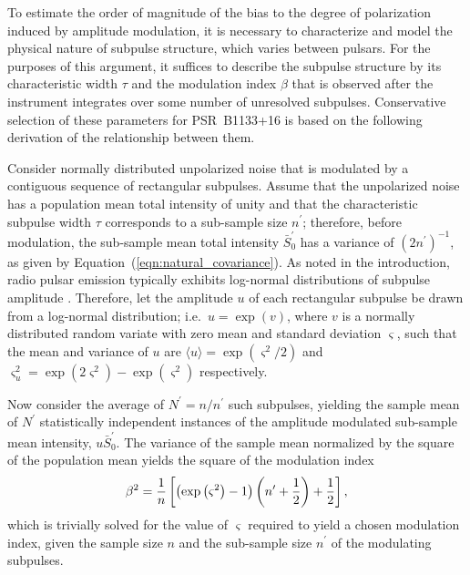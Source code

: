 \documentclass[twocolumn]{aastex6}
\newcommand{\Eqn}[1]{Equation~(\ref{eqn:#1})}
\begin{document}
{\begin{appendix}
To estimate the order of magnitude of the bias to the degree of
polarization induced by amplitude modulation, it is necessary to
characterize and model the physical nature of subpulse structure,
which varies between pulsars.
%
For the purposes of this argument, it suffices to describe the
subpulse structure by its characteristic width $\tau$ and the
modulation index $\beta$ that is observed after the instrument
integrates over some number of unresolved subpulses.
%
Conservative selection of these parameters for PSR~B1133+16 is based
on the following derivation of the relationship between them.

Consider normally distributed unpolarized noise that is modulated by a
contiguous sequence of rectangular subpulses.
%
Assume that the unpolarized noise has a population mean total
intensity of unity and that the characteristic subpulse width $\tau$
corresponds to a sub-sample size $n^\prime$; therefore, before modulation,
the sub-sample mean total intensity $\bar{S}^\prime_0$ has a variance of
$(2n^\prime)^{-1}$, as given by \Eqn{natural_covariance}.
%
As noted in the introduction, radio pulsar emission
typically exhibits log-normal distributions of subpulse amplitude
\citep[e.g.][]{cjd03a,ovb+14}.
%
Therefore, let the amplitude $u$ of each rectangular subpulse be
drawn from a log-normal distribution; i.e.\ $u=\exp(v)$, where $v$ is
a normally distributed random variate with zero mean and standard
deviation $\varsigma$, such that the mean and variance of $u$ are
%
$\langle u \rangle = \exp\left(\varsigma^2/2\right)$
%
and
%
$\varsigma_u^2 = \exp\left(2\varsigma^2\right)-\exp\left(\varsigma^2\right)$
%
respectively.  

Now consider the average of $N^\prime=n/n^\prime$ such subpulses, yielding the
sample mean of $N^\prime$ statistically independent instances of the
amplitude modulated sub-sample mean intensity, $u\bar{S}_0^\prime$.  The
variance of the sample mean normalized by the square of the population
mean yields the square of the modulation index
%
\begin{equation}
\beta^2 = {1\over n}\left[\left(\exp\left(\varsigma^2\right)-1\right)
                    \left(n^\prime+\frac{1}{2}\right)
                    +\frac{1}{2}\right],
\label{eqn:rectangular_modulation}
\end{equation}
which is trivially solved for the value of $\varsigma$ required to
yield a chosen modulation index, given the sample size $n$ and the
sub-sample size $n^\prime$ of the modulating subpulses.


\end{appendix}}
\end{document}
